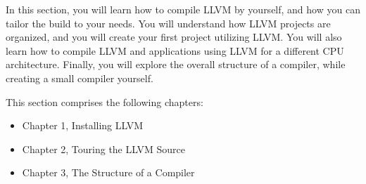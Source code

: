 
In this section, you will learn how to compile LLVM by yourself, and how you can tailor the build to your needs. You will understand how LLVM projects are organized, and you will create your first project utilizing LLVM. You will also learn how to compile LLVM and applications using LLVM for a different CPU architecture. Finally, you will explore the overall structure of a compiler, while creating a small compiler yourself.\par

This section comprises the following chapters:\par

\begin{itemize}
	\item Chapter 1, Installing LLVM
	\item Chapter 2, Touring the LLVM Source
	\item Chapter 3, The Structure of a Compiler
\end{itemize}
